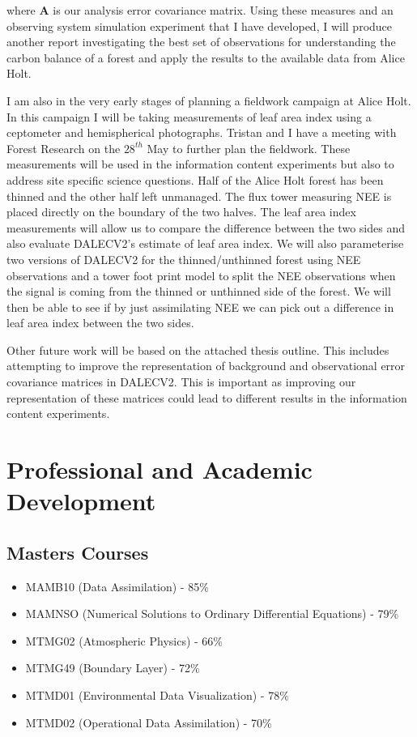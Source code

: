 \documentclass[11pt]{article}
\begin{document}
where $\textbf{A}$ is our analysis error covariance matrix. Using these measures and an observing system simulation experiment that I have developed, I will produce another report investigating the best set of observations for understanding the carbon balance of a forest and apply the results to the available data from Alice Holt. 

I am also in the very early stages of planning a fieldwork campaign at Alice Holt. In this campaign I will be taking measurements of leaf area index using a ceptometer and hemispherical photographs. Tristan and I have a meeting with Forest Research on the $28^{th}$ May to further plan the fieldwork. These measurements will be used in the information content experiments but also to address site specific science questions. Half of the Alice Holt forest has been thinned and the other half left unmanaged.  The flux tower measuring NEE is placed directly on the boundary of the two halves. The leaf area index measurements will allow us to compare the difference between the two sides and also evaluate DALECV2's estimate of leaf area index. We will also parameterise two versions of DALECV2 for the thinned/unthinned forest using NEE observations and a tower foot print model to split the NEE observations when the signal is coming from the thinned or unthinned side of the forest. We will then be able to see if by just assimilating NEE we can pick out a difference in leaf area index between the two sides.

Other future work will be based on the attached thesis outline. This includes attempting to improve the representation of background and observational error covariance matrices in DALECV2. This is important as improving our representation of these matrices could lead to different results in the information content experiments.  



\section{Professional and Academic Development}

\subsection{Masters Courses}
\begin{itemize}
\item MAMB10 (Data Assimilation) - 85\%
\item MAMNSO (Numerical Solutions to Ordinary Differential Equations) - 79\%
\item MTMG02 (Atmospheric Physics) - 66\%
\item MTMG49 (Boundary Layer) - 72\%
\item MTMD01 (Environmental Data Visualization) - 78\%
\item MTMD02 (Operational Data Assimilation) - 70\%
\end{itemize}
\end{document}
